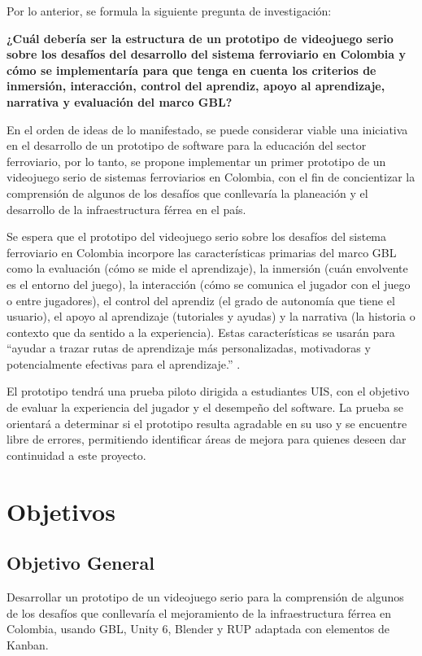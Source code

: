 Por lo anterior, se formula la siguiente pregunta de investigación:

\textbf{¿Cuál debería ser la estructura de un prototipo de videojuego serio sobre los desafíos del desarrollo del sistema ferroviario en Colombia y cómo se implementaría para que tenga en cuenta los criterios de inmersión, interacción, control del aprendiz, apoyo al aprendizaje, narrativa y evaluación del marco GBL?}

En el orden de ideas de lo manifestado, se puede considerar viable una iniciativa en el desarrollo de un prototipo de software para la educación del sector ferroviario, por lo tanto, se propone implementar un primer prototipo de un videojuego serio de sistemas ferroviarios en Colombia, con el fin de concientizar la comprensión de algunos de los desafíos que conllevaría la planeación y el desarrollo de la infraestructura férrea en el país.

Se espera que el prototipo del videojuego serio sobre los desafíos del sistema ferroviario en Colombia incorpore las características primarias del marco GBL como la evaluación (cómo se mide el aprendizaje), la inmersión (cuán envolvente es el entorno del juego), la interacción (cómo se comunica el jugador con el juego o entre jugadores), el control del aprendiz (el grado de autonomía que tiene el usuario), el apoyo al aprendizaje (tutoriales y ayudas) y la narrativa (la historia o contexto que da sentido a la experiencia). Estas características se usarán para “ayudar a trazar rutas de aprendizaje más personalizadas, motivadoras y potencialmente efectivas para el aprendizaje.” \autocite[p.~10]{gblHandbook2019}.

El prototipo tendrá una prueba piloto dirigida a estudiantes UIS, con el objetivo de evaluar la experiencia del jugador y el desempeño del software. La prueba se orientará a determinar si el prototipo resulta agradable en su uso y se encuentre libre de errores, permitiendo identificar áreas de mejora para quienes deseen dar continuidad a este proyecto.

\newpage
\section{Objetivos}

\subsection{Objetivo General}
Desarrollar un prototipo de un videojuego serio para la comprensión de algunos de los desafíos que conllevaría el mejoramiento de la infraestructura férrea en Colombia, usando GBL, Unity 6, Blender y RUP adaptada con elementos de Kanban.

